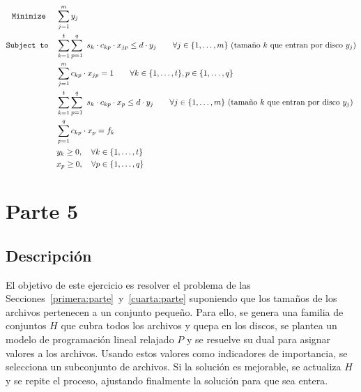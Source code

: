 \documentclass[11pt, a4paper, pdftex]{article}
\begin{document}
\begin{alignat*}{2}
	\minimize
	& \sum_{j = 1}^{m} y_{j}\\
	\subjto
	& \sum_{k=1}^{t} \sum_{p = 1}^{q}\ s_{k} \cdot c_{kp} \cdot x_{jp} \le d\cdot y_{j} \qquad \forall j \in \{1, \ldots, m\}\ \text{(tamaño $k$ que entran por disco $y_{j}$)}\\
	& \sum_{j=1}^{m} c_{kp} \cdot x_{jp} = 1 \qquad \forall k \in \{1, \ldots, t\}, p \in \{1, \ldots, q\} \\
	& \sum_{k=1}^{t} \sum_{p = 1}^{q}\ s_{k} \cdot c_{kp} \cdot x_{p} \le d\cdot y_{j} \qquad \forall j \in \{1, \ldots, m\}\ \text{(tamaño $k$ que entran por disco $y_{j}$)}\\
	& \sum_{p = 1}^{q} c_{kp} \cdot x_{p} = f_{k} \\
	& y_{k} \ge 0, \quad \forall k \in \{1, \ldots, t\} \\
	& x_{p} \ge 0, \quad \forall p \in \{1, \ldots, q\}
\end{alignat*}

\section{Parte 5}\label{quinta:parte}

\subsection{Descripción}

El objetivo de este ejercicio es resolver el problema de las
Secciones~\ref{primera:parte}~y~\ref{cuarta:parte} suponiendo que los tamaños
de los archivos pertenecen a un conjunto pequeño. Para ello, se genera una
familia de conjuntos $H$ que cubra todos los archivos y quepa en los discos, se
plantea un modelo de programación lineal relajado $P$ y se resuelve su dual
para asignar valores a los archivos. Usando estos valores como indicadores de
importancia, se selecciona un subconjunto de archivos. Si la solución es
mejorable, se actualiza $H$ y se repite el proceso, ajustando finalmente la
solución para que sea entera.


\end{document}
